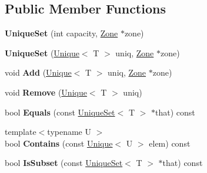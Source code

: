 \subsection*{Public Member Functions}
\begin{DoxyCompactItemize}
\item 
{\bfseries Unique\+Set} (int capacity, \hyperlink{classv8_1_1internal_1_1_zone}{Zone} $\ast$zone)\hypertarget{classv8_1_1internal_1_1_unique_set_a6219ae169c32313da5ad09903c707246}{}\label{classv8_1_1internal_1_1_unique_set_a6219ae169c32313da5ad09903c707246}

\item 
{\bfseries Unique\+Set} (\hyperlink{classv8_1_1internal_1_1_unique}{Unique}$<$ T $>$ uniq, \hyperlink{classv8_1_1internal_1_1_zone}{Zone} $\ast$zone)\hypertarget{classv8_1_1internal_1_1_unique_set_a72f03255346a8130b1fbe51a7da4ac7c}{}\label{classv8_1_1internal_1_1_unique_set_a72f03255346a8130b1fbe51a7da4ac7c}

\item 
void {\bfseries Add} (\hyperlink{classv8_1_1internal_1_1_unique}{Unique}$<$ T $>$ uniq, \hyperlink{classv8_1_1internal_1_1_zone}{Zone} $\ast$zone)\hypertarget{classv8_1_1internal_1_1_unique_set_ab0a5d43047cadfdf6d6dd2d021c8eda3}{}\label{classv8_1_1internal_1_1_unique_set_ab0a5d43047cadfdf6d6dd2d021c8eda3}

\item 
void {\bfseries Remove} (\hyperlink{classv8_1_1internal_1_1_unique}{Unique}$<$ T $>$ uniq)\hypertarget{classv8_1_1internal_1_1_unique_set_aac864e333c8fc41c508a8074b708315c}{}\label{classv8_1_1internal_1_1_unique_set_aac864e333c8fc41c508a8074b708315c}

\item 
bool {\bfseries Equals} (const \hyperlink{classv8_1_1internal_1_1_unique_set}{Unique\+Set}$<$ T $>$ $\ast$that) const \hypertarget{classv8_1_1internal_1_1_unique_set_a2d3e1d68ed25afcf0b2d11b5b7c756e4}{}\label{classv8_1_1internal_1_1_unique_set_a2d3e1d68ed25afcf0b2d11b5b7c756e4}

\item 
{\footnotesize template$<$typename U $>$ }\\bool {\bfseries Contains} (const \hyperlink{classv8_1_1internal_1_1_unique}{Unique}$<$ U $>$ elem) const \hypertarget{classv8_1_1internal_1_1_unique_set_a7a4900a02c2581df6e4882be24009386}{}\label{classv8_1_1internal_1_1_unique_set_a7a4900a02c2581df6e4882be24009386}

\item 
bool {\bfseries Is\+Subset} (const \hyperlink{classv8_1_1internal_1_1_unique_set}{Unique\+Set}$<$ T $>$ $\ast$that) const \hypertarget{classv8_1_1internal_1_1_unique_set_ad3584f468e6121c7c7bbc04b61cb49d7}{}\label{classv8_1_1internal_1_1_unique_set_ad3584f468e6121c7c7bbc04b61cb49d7}


\end{DoxyCompactItemize}
